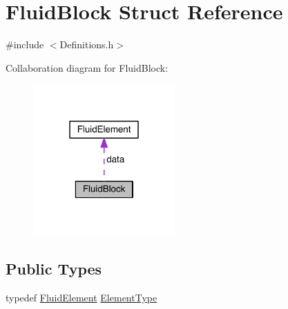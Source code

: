\hypertarget{struct_fluid_block}{}\section{Fluid\+Block Struct Reference}
\label{struct_fluid_block}


{\ttfamily \#include $<$Definitions.\+h$>$}



Collaboration diagram for Fluid\+Block\+:\nopagebreak
\begin{figure}[H]
\begin{center}
\leavevmode
\includegraphics[width=154pt]{d1/da0/struct_fluid_block__coll__graph}
\end{center}
\end{figure}
\subsection*{Public Types}
\begin{DoxyCompactItemize}
\item 
typedef \hyperlink{struct_fluid_element}{Fluid\+Element} \hyperlink{struct_fluid_block_ada33fbdab33f2688d3eb632118de5a6e}{Element\+Type}
\end{DoxyCompactItemize}
